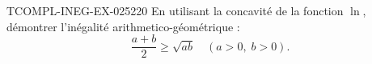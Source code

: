 \begin{exercice}{TCOMPL-INEG-EX-025}{2}{20}
En utilisant la concavité de la fonction $\ln$, démontrer l'inégalité arithmetico-géométrique :
\[ \frac{a+b}{2} \geq \sqrt{ab} \quad (a > 0,\; b > 0). \]

\end{exercice}
